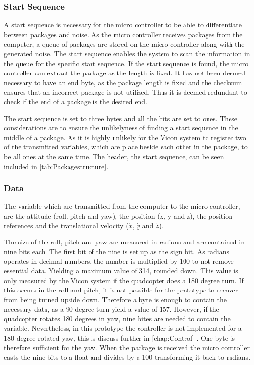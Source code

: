 \subsubsection{Start Sequence}
A start sequence is necessary for the micro controller to be able to differentiate between packages and noise. As the micro controller receives packages from the computer, a queue of packages are stored on the micro controller along with the generated noise. The start sequence enables the system to scan the information in the queue for the specific start sequence. If the start sequence is found, the micro controller can extract the package as the length is fixed. It has not been deemed necessary to have an end byte, as the package length is fixed and the checksum ensures that an incorrect package is not utilized. Thus it is deemed redundant to check if the end of a package is the desired end.

The start sequence is set to three bytes and all the bits are set to ones. These considerations are to ensure the unlikelyness of finding a start sequence in the middle of a package. As it is highly unlikely for the Vicon system to register two of the transmitted variables, which are place beside each other in the package, to be all ones at the same time. The header, the start sequence, can be seen included in \autoref{tab:Packagestructure}.

\subsubsection{Data}
The variable which are transmitted from the computer to the micro controller, are the attitude (roll, pitch and yaw), the position (x, y and z), the position references and the translational velocity ($\dot{x}$, $\dot{y}$ and $\dot{z}$).

The size of the roll, pitch and yaw are measured in radians and are contained in nine bits each. The first bit of the nine is set up as the sign bit. As radians operates in decimal numbers, the number is multiplied by 100 to not remove essential data. Yielding a maximum value of 314, rounded down. This value is only measured by the Vicon system if the quadcopter does a 180 degree turn. If this occurs in the roll and pitch, it is not possible for the prototype to recover from being turned upside down. Therefore a byte is enough to contain the necessary data, as a 90 degree turn yield a value of 157. However, if the quadcopter rotates 180 degrees in yaw, nine bites are needed to contain the variable. Nevertheless, in this prototype the controller is not implemented for a 180 degree rotated yaw, this is discuss further in \autoref{chap:Control} . One byte is therefore sufficient for the yaw. When the package is received the micro controller casts the nine bits to a float and divides by a 100 transforming it back to radians.

